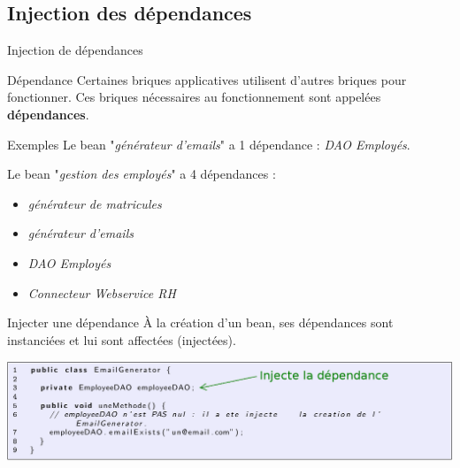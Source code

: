 \documentclass[compress]{beamer}%
\begin{document}
\subsection{Injection des dépendances}

\begin{frame}{Injection de dépendances}

	\begin{block}{Dépendance}
		Certaines briques applicatives utilisent d'autres briques pour fonctionner. Ces briques nécessaires au fonctionnement sont appelées \textbf{dépendances}.
	\end{block}

	\pause
	\begin{exampleblock}{Exemples}
		Le bean "\emph{générateur d'emails}" a 1 dépendance : \emph{DAO Employés}.

	\pause
		Le bean "\emph{gestion des employés}" a 4 dépendances :
		\begin{itemize}
			\item \emph{générateur de matricules}
			\item \emph{générateur d'emails}
			\item \emph{DAO Employés}
			\item \emph{Connecteur Webservice RH}
		\end{itemize}
	\end{exampleblock}

\end{frame}

\begin{frame}%

	\begin{block}{Injecter une dépendance}
		\`A la création d'un bean, ses dépendances sont instanciées et lui sont affectées (injectées).
	\end{block}

	\pause
% 
% 
	\includegraphics[width=\textwidth]{images/inject_code.png}


\end{frame}
\end{document}
